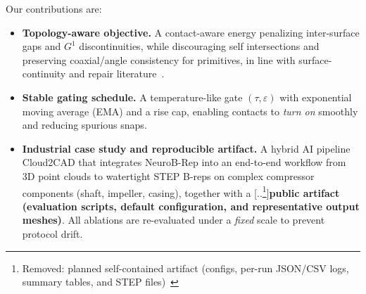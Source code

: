 \documentclass{ieeeaccess}
\providecommand{\DIFaddtex}[1]{{\color{blue}\bfseries #1}} %
\providecommand{\DIFdeltex}[1]{{\color{red}[..\footnote{\color{black}Removed: #1}]}} %
\providecommand{\DIFaddbegin}{} %
\providecommand{\DIFaddend}{} %
\providecommand{\DIFdelbegin}{} %
\providecommand{\DIFdelend}{} %
\providecommand{\DIFadd}[1]{\texorpdfstring{\DIFaddtex{#1}}{#1}} %
\providecommand{\DIFdel}[1]{\texorpdfstring{\DIFdeltex{#1}}{}} %
\begin{document}
Our contributions are:
\begin{itemize}
  \item \textbf{Topology-aware objective.} A contact-aware energy penalizing inter-surface gaps and $G^1$ discontinuities, while discouraging self intersections and preserving coaxial/angle consistency for primitives, in line with surface-continuity and repair literature~\cite{b10,b11,b12,b22}.
  \item \textbf{Stable gating schedule.} A temperature-like gate $(\tau,\varepsilon)$ with exponential moving average (EMA) and a rise cap, enabling contacts to \emph{turn on} smoothly and reducing spurious snaps.
  \item \textbf{Industrial case study and reproducible artifact.} A hybrid AI pipeline Cloud2CAD that integrates NeuroB-Rep into an end-to-end workflow from 3D point clouds to watertight STEP B-reps on complex compressor components (shaft, impeller, casing), together with a \DIFdelbegin \DIFdel{planned self-contained artifact (configs, per-run JSON/CSV logs, summary tables, and STEP files)~\cite{b2}}\DIFdelend \DIFaddbegin \DIFadd{public artifact (evaluation scripts, default configuration, and representative output meshes)}\DIFaddend . All ablations are re-evaluated under a \emph{fixed} scale to prevent protocol drift.
\end{itemize}
\end{document}
